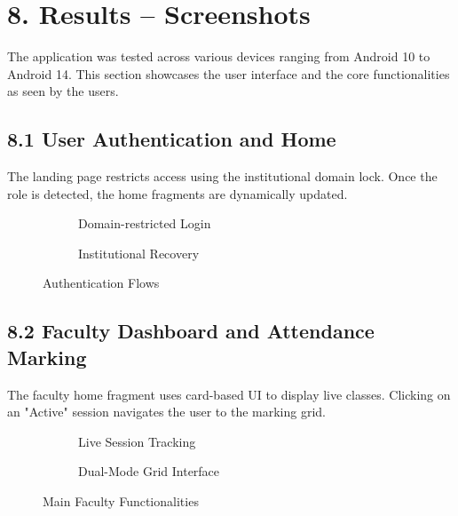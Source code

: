 \documentclass[12pt,a4paper]{report}
\begin{document}
\chapter*{8. Results -- Screenshots}

The application was tested across various devices ranging from Android 10 to Android 14. This section showcases the user interface and the core functionalities as seen by the users.

\section*{8.1 User Authentication and Home}
The landing page restricts access using the institutional domain lock. Once the role is detected, the home fragments are dynamically updated.

\begin{figure}[H]
    \centering
    \begin{subfigure}[b]{0.45\textwidth}
        \centering
        \caption{Domain-restricted Login}
    \end{subfigure}
    \hfill
    \begin{subfigure}[b]{0.45\textwidth}
        \centering
        \caption{Institutional Recovery}
    \end{subfigure}
    \caption{Authentication Flows}
\end{figure}

\section*{8.2 Faculty Dashboard and Attendance Marking}
The faculty home fragment uses card-based UI to display live classes. Clicking on an "Active" session navigates the user to the marking grid.

\begin{figure}[H]
    \centering
    \begin{subfigure}[b]{0.45\textwidth}
        \centering
        \caption{Live Session Tracking}
    \end{subfigure}
    \hfill
    \begin{subfigure}[b]{0.45\textwidth}
        \centering
        \caption{Dual-Mode Grid Interface}
    \end{subfigure}
    \caption{Main Faculty Functionalities}
\end{figure}
\end{document}
